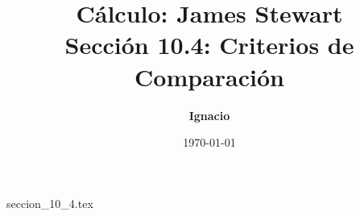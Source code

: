 \documentclass[11pt,spanish,oneside]{report}
\title{\textbf{Cálculo: James Stewart} \\ \Large Sección 10.4: Criterios de Comparación}
\author{\textbf{Ignacio}}
\date{\today}
\begin{document}
\maketitle

{seccion_10_4.tex}
\end{document}
